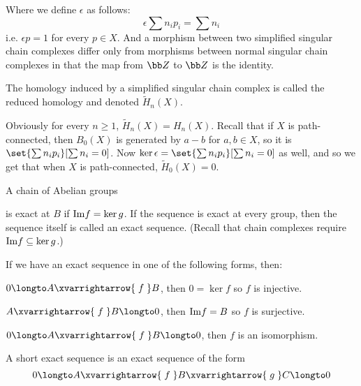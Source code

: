     Where we define $\epsilon$ as follows:
    $$ \epsilon\sum n_ip_i = \sum n_i $$
    i.e. $\epsilon p=1$ for every $p\in X$.
    And a morphism between two simplified singular chain complexes differ only from morphisms between normal singular chain complexes in that the map from ${\bb Z}$ to ${\bb Z}$ is the identity.

    The homology induced by a simplified singular chain complex is called the {\emphcolor reduced homology} and denoted $\tilde H_n(X)$.

\edefn

Obviously for every $n\geq1$, $\tilde H_n(X)=H_n(X)$.
Recall that if $X$ is path-connected, then $B_0(X)$ is generated by $a-b$ for $a,b\in X$, so it is $\set{\sum n_ip_i}[\sum n_i=0]$.
Now $\ker\epsilon=\set{\sum n_ip_i}[\sum n_i=0]$ as well, and so we get that when $X$ is path-connected, $\tilde H_0(X)=0$.

\bdefn

    A chain of Abelian groups

    \bigskip
    \centerline{}
    \bigskip

    is {\emphcolor exact} at $B$ if ${\rm Im}f=\ker g$.
    If the sequence is exact at every group, then the sequence itself is called an {\emphcolor exact sequence}.
    (Recall that chain complexes require ${\rm Im}f\subseteq\ker g$.)

\edefn

If we have an exact sequence in one of the following forms, then:

\benum
    \item $0\longto A\xvarrightarrow{\;f\;}B$, then $0=\ker f$ so $f$ is injective.
    \item $A\xvarrightarrow{\;f\;}B\longto0$, then ${\rm Im}f=B$ so $f$ is surjective.
    \item $0\longto A\xvarrightarrow{\;f\;}B\longto0$, then $f$ is an isomorphism.
\eenum

\bdefn

    A {\emphcolor short exact sequence} is an exact sequence of the form
    $$ 0\longto A\xvarrightarrow{\;f\;}B\xvarrightarrow{\;g\;}C\longto0 $$

